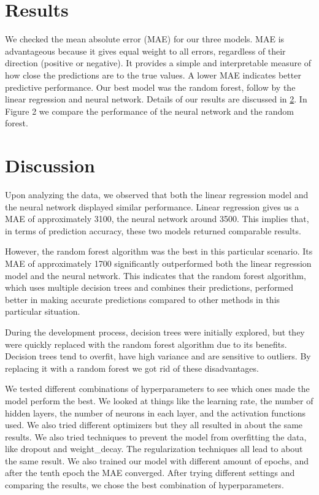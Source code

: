 \documentclass[a4, 10 pt, conference]{ieeeconf}  %
\begin{document}
\section{Results}
\label{sec:results}
We checked the mean absolute error (MAE) for our three models. MAE is advantageous because it gives equal weight to all errors, regardless of their direction (positive or negative). It provides a simple and interpretable measure of how close the predictions are to the true values. A lower MAE indicates better predictive performance.
Our best model was the random forest, follow by the linear regression and neural network. Details of our results are discussed in \ref{sec:discuss}. In Figure 2 we compare the performance of the neural network and the random forest. 


\section{Discussion}
\label{sec:discuss}


Upon analyzing the data, we observed that both the linear regression model and the neural network displayed similar performance. Linear regression gives us a MAE of approximately 3100, the neural network around 3500. This implies that, in terms of prediction accuracy, these two models returned comparable results.

However, the random forest algorithm was the best in this particular scenario. Its MAE of approximately 1700 significantly outperformed both the linear regression model and the neural network. This indicates that the random forest algorithm, which uses multiple decision trees and combines their predictions, performed better in making accurate predictions compared to other methods in this particular situation.

During the development process, decision trees were initially explored, but they were quickly replaced with the random forest algorithm due to its benefits. Decision trees tend to overfit, have high variance and are sensitive to outliers. By replacing it with a random forest we got rid of these disadvantages. 

We tested different combinations of hyperparameters to see which ones made the model perform the best. We looked at things like the learning rate, the number of hidden layers, the number of neurons in each layer, and the activation functions used. We also tried different optimizers but they all resulted in about the same results. We also tried techniques to prevent the model from overfitting the data, like dropout and weight\_decay. The regularization techniques all lead to about the same result. 
We also trained our model with different amount of epochs, and after the tenth epoch the MAE converged. After trying different settings and comparing the results, we chose the best combination of hyperparameters.
\end{document}
